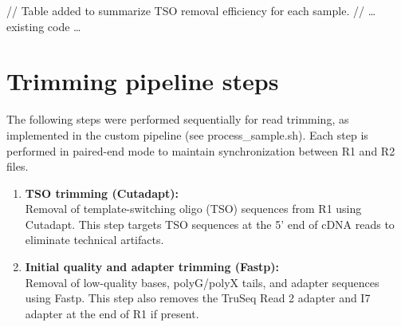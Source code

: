 \documentclass[
  11pt,
  a4paper,
]{report}
\newenvironment{Shaded}{\begin{snugshade}}{\end{snugshade}}
\newcommand{\AttributeTok}[1]{\textcolor[rgb]{0.40,0.45,0.13}{#1}}
\newcommand{\DataTypeTok}[1]{\textcolor[rgb]{0.68,0.00,0.00}{#1}}
\newcommand{\ExtensionTok}[1]{\textcolor[rgb]{0.00,0.23,0.31}{#1}}
\newcommand{\NormalTok}[1]{\textcolor[rgb]{0.00,0.23,0.31}{#1}}
\newcommand{\OperatorTok}[1]{\textcolor[rgb]{0.37,0.37,0.37}{#1}}
\newcommand{\StringTok}[1]{\textcolor[rgb]{0.13,0.47,0.30}{#1}}
\newcommand{\VariableTok}[1]{\textcolor[rgb]{0.07,0.07,0.07}{#1}}
\begin{document}
// Table added to summarize TSO removal efficiency for each sample. //
\ldots{} existing code \ldots{}

\section{Trimming pipeline steps}\label{sec-appendix-trimming-steps}

The following steps were performed sequentially for read trimming, as
implemented in the custom pipeline (see process\_sample.sh). Each step
is performed in paired-end mode to maintain synchronization between R1
and R2 files.

\begin{enumerate}
\def\labelenumi{\arabic{enumi}.}
\item
  \textbf{TSO trimming (Cutadapt):}\\
  Removal of template-switching oligo (TSO) sequences from R1 using
  Cutadapt. This step targets TSO sequences at the 5' end of cDNA reads
  to eliminate technical artifacts.

\begin{Shaded}
\end{Shaded}
\item
  \textbf{Initial quality and adapter trimming (Fastp):}\\
  Removal of low-quality bases, polyG/polyX tails, and adapter sequences
  using Fastp. This step also removes the TruSeq Read 2 adapter and I7
  adapter at the end of R1 if present.


\end{enumerate}
\end{document}
